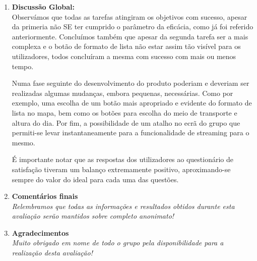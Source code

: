 \documentclass[11pt]{article}
\begin{document}
\begin{enumerate}
        
        \item \textbf{Discussão Global:}\\
        Observámos que todas as tarefas  atingiram os objetivos com sucesso, apesar da primeria não SE ter cumprido o parâmetro da eficácia, como já foi referido anteriormente.
        Concluímos também que apesar da segunda tarefa ser a mais complexa e o botão de formato de lista não estar assim tão visível para os utilizadores, todos concluíram a mesma com sucesso com mais ou menos tempo.
        
        Numa fase seguinte do desenvolvimento do produto poderiam e deveriam ser realizadas algumas mudanças, embora pequenas, necessárias. Como por exemplo, uma escolha de um botão mais apropriado e evidente do formato de lista no mapa, bem como os botões para escolha do meio de transporte e altura do dia. Por fim, a possibilidade de um atalho no ecrã do grupo que permiti-se levar instantaneamente para a funcionalidade de streaming para o mesmo.
        
        É importante notar que as respostas dos utilizadores ao questionário de satisfação tiveram um balanço extremamente positivo, aproximando-se sempre do valor do ideal para cada uma das questões.
        
        \item \textbf{Comentários finais}\\
        \textit{Relembramos que todas as informações e resultados obtidos durante esta avaliação serão mantidos sobre completo anonimato!}
        
        \item \textbf{Agradecimentos}\\
        \textit{Muito obrigado em nome de todo o grupo pela disponibilidade para a realização desta avaliação!}
    \end{enumerate}
    
\end{document}
